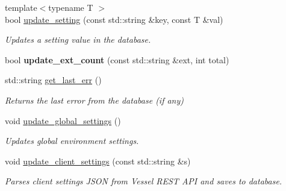 \begin{DoxyCompactItemize}
{\footnotesize template$<$typename T $>$ }\\bool \hyperlink{class_vessel_1_1_database_1_1_local_database_a94da226c9c5561a4cb88290c6aa334a3}{update\+\_\+setting} (const std\+::string \&key, const T \&val)
\begin{DoxyCompactList}\small\item\em Updates a setting value in the database. \end{DoxyCompactList}\item 
\mbox{\label{class_vessel_1_1_database_1_1_local_database_a6894636c19e4781f619b2f6a50ae7994}} 
bool {\bfseries update\+\_\+ext\+\_\+count} (const std\+::string \&ext, int total)
\item 
std\+::string \hyperlink{class_vessel_1_1_database_1_1_local_database_a2604bed46b522977ba77140626282f3d}{get\+\_\+last\+\_\+err} ()
\begin{DoxyCompactList}\small\item\em Returns the last error from the database (if any) \end{DoxyCompactList}\item 
\mbox{\label{class_vessel_1_1_database_1_1_local_database_ac8639c0eb1ed8757b080de38e0314222}} 
void \hyperlink{class_vessel_1_1_database_1_1_local_database_ac8639c0eb1ed8757b080de38e0314222}{update\+\_\+global\+\_\+settings} ()
\begin{DoxyCompactList}\small\item\em Updates global environment settings. \end{DoxyCompactList}\item 
\mbox{\label{class_vessel_1_1_database_1_1_local_database_ae43917bc8ebb0f0269da1ac68685a040}} 
void \hyperlink{class_vessel_1_1_database_1_1_local_database_ae43917bc8ebb0f0269da1ac68685a040}{update\+\_\+client\+\_\+settings} (const std\+::string \&s)
\begin{DoxyCompactList}\small\item\em Parses client settings J\+S\+ON from Vessel R\+E\+ST A\+PI and saves to database. \end{DoxyCompactList}\item 
\mbox{\label{class_vessel_1_1_database_1_1_local_database_a4863f63ed1a6ad1dbbcce0208759a5d7}} 

\end{DoxyCompactItemize}
